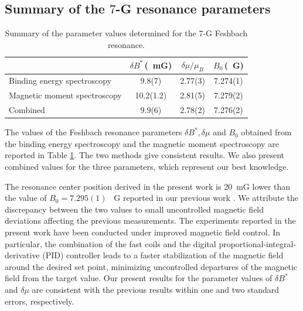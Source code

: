 \subsection{Summary of the $7$-G resonance parameters}\label{SubSec:FBParametersDiscussion}

\begin{table}[b]
		\caption{\label{Table:FBParameter} Summary of the parameter values determined for the 7-G Feshbach resonance.}
		\begin{tabular}{lccc}%
			\hline
			\hline
			\textrm{}&
			$\delta B^*\,$(\SI{}{\milli G})&
			$\delta\mu/\mu_B$ &
			$B_0\,$(\SI{}{ G})\\
			\hline
			\textrm{Binding energy spectroscopy} & 9.8(7) & 2.77(3) & 7.274(1) \\
			\textrm{Magnetic moment spectroscopy} & 10.2(1.2) & 2.81(5) & 7.279(2) \\
			Combined & 9.9(6) & 2.78(2) & 7.276(2) \\
			\hline
			\hline
		\end{tabular}
\end{table}

The values of the Feshbach resonance parameters $\delta B^*, \delta\mu$ and $B_0$ obtained from the binding energy spectroscopy and the magnetic moment spectroscopy are reported in Table \ref{Table:FBParameter}. The two methods give consistent results. We also present combined values for the three parameters, which represent our best knowledge.


The resonance center position derived in the present work is \SI{20}{\milli G} lower than the value of $B_0=7.295(1)$ \SI{}{ G} reported in our previous work \cite{Ye2022ool}.
We attribute the discrepancy between the two values to small uncontrolled magnetic field deviations affecting the previous measurements. The experiments reported in the present work have been conducted under improved magnetic field control. In particular, the combination of the fast coils and the digital proportional-integral-derivative (PID) controller leads to a faster stabilization of the magnetic field around the desired set point, minimizing uncontrolled departures of the magnetic field from the target value. Our present results for the parameter values of $\delta B^*$ and $\delta\mu$ are consistent with the previous results within one and two standard errors, respectively.


